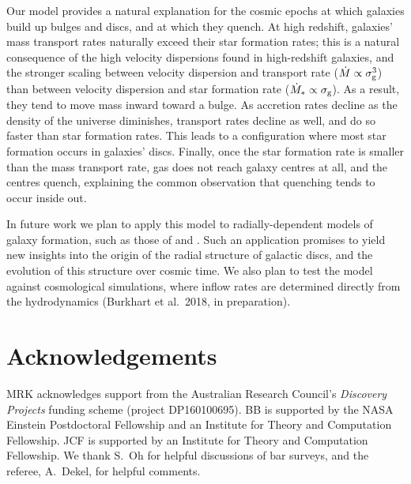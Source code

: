 \documentclass[useAMS,usenatbib]{mn2e}
\begin{document}
Our model provides a natural explanation for the cosmic epochs at which galaxies build up bulges and discs, and at which they quench. At high redshift, galaxies' mass transport rates naturally exceed their star formation rates; this is a natural consequence of the high velocity dispersions found in high-redshift galaxies, and the stronger scaling between velocity dispersion and transport rate ($\dot{M} \propto \sigma_{\rm g}^3$) than between velocity dispersion and star formation rate ($\dot{M}_* \propto \sigma_{\rm g}$). As a result, they tend to move mass inward toward a bulge. As accretion rates decline as the density of the universe diminishes, transport rates decline as well, and do so faster than star formation rates. This leads to a configuration where most star formation occurs in galaxies' discs. Finally, once the star formation rate is smaller than the mass transport rate, gas does not reach galaxy centres at all, and the centres quench, explaining the common observation that quenching tends to occur inside out.

In future work we plan to apply this model to radially-dependent models of galaxy formation, such as those of \citet{forbes12a} and \citet{forbes14a}. Such an application promises to yield new insights into the origin of the radial structure of galactic discs, and the evolution of this structure over cosmic time. We also plan to test the model against cosmological simulations, where inflow rates are determined directly from the hydrodynamics (Burkhart et al.~2018, in preparation).

\section*{Acknowledgements}

MRK acknowledges support from the Australian Research Council's \textit{Discovery Projects} funding scheme (project DP160100695). BB is supported by the NASA Einstein Postdoctoral Fellowship and an Institute for Theory and Computation Fellowship. JCF is supported by an Institute for Theory and Computation Fellowship. We thank S.~Oh for helpful discussions of bar surveys, and the referee, A.~Dekel, for helpful comments.



\end{document}
